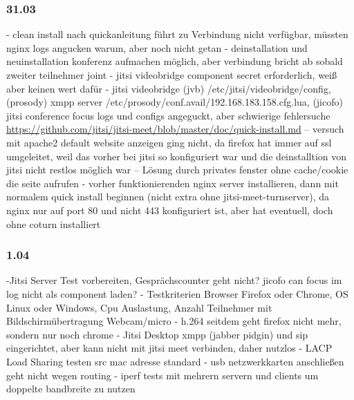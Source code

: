 \documentclass[english,runningheads,a4paper]{llncs}[2018/03/10]
\begin{document}
\subsubsection{31.03}
- clean install nach quickanleitung führt zu Verbindung nicht verfügbar, müssten nginx logs angucken warum, aber noch nicht getan
- deinstallation und neuinstallation konferenz aufmachen möglich, aber verbindung bricht ab sobald zweiter teilnehmer joint
- jitsi videobridge component secret erforderlich, weiß aber keinen wert dafür
- jitsi videobridge (jvb) /etc/jitsi/videobridge/config, (prosody) xmpp server /etc/prosody/conf.avail/192.168.183.158.cfg.lua, (jicofo) jitsi conference focus logs und configs angeguckt, aber schwierige fehlersuche
\url{https://github.com/jitsi/jitsi-meet/blob/master/doc/quick-install.md}
-- versuch mit apache2 default website anzeigen ging nicht, da  firefox hat immer auf ssl umgeleitet, weil das vorher bei jitsi so konfiguriert war und die deinstalltion von jitsi nicht restlos möglich war
-- Lösung durch privates fenster ohne cache/cookie die seite aufrufen
- vorher funktionierenden nginx server installieren, dann mit normalem quick install beginnen (nicht extra ohne jitsi-meet-turnserver), da nginx nur auf port 80 und nicht 443 konfiguriert ist, aber hat eventuell, doch ohne coturn installiert

\subsubsection{1.04}
-Jitsi Server Test vorbereiten, Gesprächscounter geht nicht? jicofo can focus im log nicht als component laden?
- Testkriterien Browser Firefox oder Chrome, OS Linux oder Windows, Cpu Auslastung, Anzahl Teilnehmer mit Bildschirmübertragung Webcam/micro
- h.264 seitdem geht firefox nicht mehr, sondern nur noch chrome
- Jitsi Desktop xmpp (jabber pidgin) und sip eingerichtet, aber kann nicht mit jitsi meet verbinden, daher nutzlos
- LACP Load Sharing testen src mac adresse standard
- usb netzwerkkarten anschließen geht nicht wegen routing
- iperf tests mit mehrern servern und clients um doppelte bandbreite zu nutzen
\end{document}
